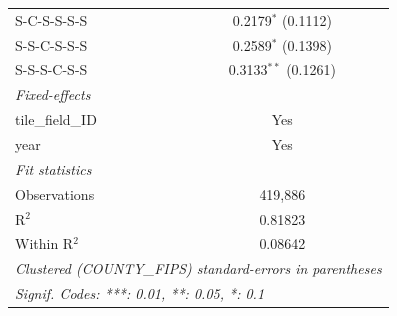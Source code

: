 \begin{table}[htbp]
\begin{tabular}{lc}
      S-C-S-S-S-S         & 0.2179$^{*}$ (0.1112)\\   
      S-S-C-S-S-S         & 0.2589$^{*}$ (0.1398)\\   
      S-S-S-C-S-S         & 0.3133$^{**}$ (0.1261)\\   
      \midrule
      \emph{Fixed-effects}\\
      tile\_field\_ID     & Yes\\  
      year                & Yes\\  
      \midrule
      \emph{Fit statistics}\\
      Observations        & 419,886\\  
      R$^2$               & 0.81823\\  
      Within R$^2$        & 0.08642\\  
      \midrule \midrule
      \multicolumn{2}{l}{\emph{Clustered (COUNTY\_FIPS) standard-errors in parentheses}}\\
      \multicolumn{2}{l}{\emph{Signif. Codes: ***: 0.01, **: 0.05, *: 0.1}}\\
   \end{tabular}
\end{table}


